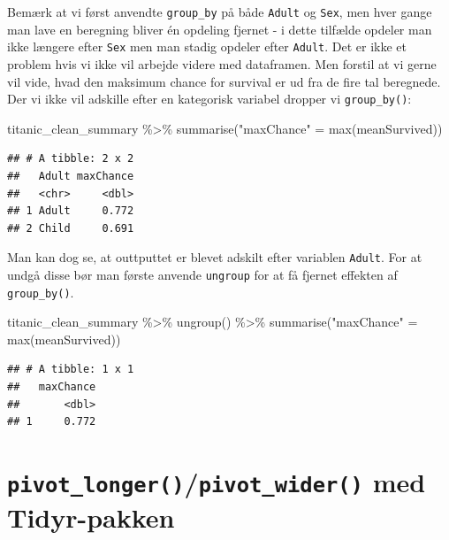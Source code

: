 \documentclass[
]{book}
\newenvironment{Shaded}{\begin{snugshade}}{\end{snugshade}}
\newcommand{\FunctionTok}[1]{\textcolor[rgb]{0.00,0.00,0.00}{#1}}
\newcommand{\NormalTok}[1]{#1}
\newcommand{\OtherTok}[1]{\textcolor[rgb]{0.56,0.35,0.01}{#1}}
\newcommand{\SpecialCharTok}[1]{\textcolor[rgb]{0.00,0.00,0.00}{#1}}
\newcommand{\StringTok}[1]{\textcolor[rgb]{0.31,0.60,0.02}{#1}}
\begin{document}
Bemærk at vi først anvendte \texttt{group\_by} på både \texttt{Adult} og \texttt{Sex}, men hver gange man lave en beregning bliver én opdeling fjernet - i dette tilfælde opdeler man ikke længere efter \texttt{Sex} men man stadig opdeler efter \texttt{Adult}. Det er ikke et problem hvis vi ikke vil arbejde videre med dataframen. Men forstil at vi gerne vil vide, hvad den maksimum chance for survival er ud fra de fire tal beregnede. Der vi ikke vil adskille efter en kategorisk variabel dropper vi \texttt{group\_by()}:

\begin{Shaded}
\begin{Highlighting}[]
\NormalTok{titanic\_clean\_summary }\SpecialCharTok{\%\textgreater{}\%} 
  \FunctionTok{summarise}\NormalTok{(}\StringTok{"maxChance"} \OtherTok{=} \FunctionTok{max}\NormalTok{(meanSurvived))}
\end{Highlighting}
\end{Shaded}

\begin{verbatim}
## # A tibble: 2 x 2
##   Adult maxChance
##   <chr>     <dbl>
## 1 Adult     0.772
## 2 Child     0.691
\end{verbatim}

Man kan dog se, at outtputtet er blevet adskilt efter variablen \texttt{Adult}. For at undgå disse bør man første anvende \texttt{ungroup} for at få fjernet effekten af \texttt{group\_by()}.

\begin{Shaded}
\begin{Highlighting}[]
\NormalTok{titanic\_clean\_summary }\SpecialCharTok{\%\textgreater{}\%} 
  \FunctionTok{ungroup}\NormalTok{() }\SpecialCharTok{\%\textgreater{}\%}
  \FunctionTok{summarise}\NormalTok{(}\StringTok{"maxChance"} \OtherTok{=} \FunctionTok{max}\NormalTok{(meanSurvived))}
\end{Highlighting}
\end{Shaded}

\begin{verbatim}
## # A tibble: 1 x 1
##   maxChance
##       <dbl>
## 1     0.772
\end{verbatim}

\hypertarget{pivot_longerpivot_wider-med-tidyr-pakken}{%
\section{\texorpdfstring{\texttt{pivot\_longer()}/\texttt{pivot\_wider()} med Tidyr-pakken}{pivot\_longer()/pivot\_wider() med Tidyr-pakken}}\label{pivot_longerpivot_wider-med-tidyr-pakken}}
\end{document}
